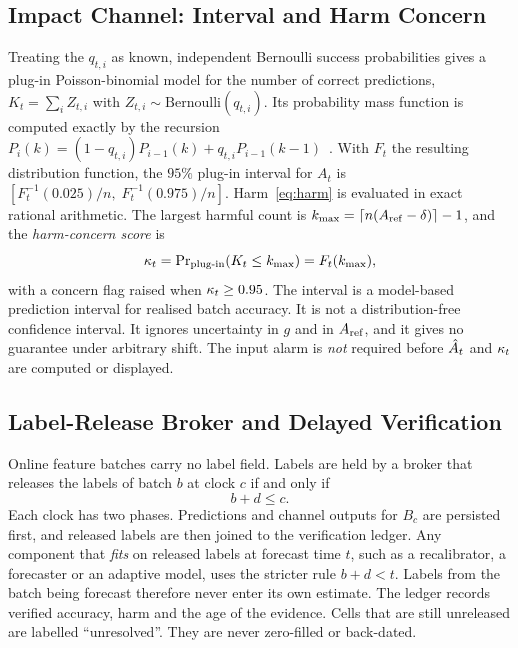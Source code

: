 \subsection{Impact Channel: Interval and Harm Concern}
Treating the $q_{t,i}$ as known, independent Bernoulli success probabilities gives
a plug-in Poisson-binomial model for the number of correct predictions,
$K_t=\sum_iZ_{t,i}$ with $Z_{t,i}\sim\mathrm{Bernoulli}(q_{t,i})$. Its probability
mass function is computed exactly by the recursion
$P_i(k)=(1-q_{t,i})P_{i-1}(k)+q_{t,i}P_{i-1}(k-1)$~\cite{hong2013poibin}.
With $F_t$ the resulting distribution function, the $95\%$ plug-in interval for
$A_t$ is $[F_t^{-1}(0.025)/n,\;F_t^{-1}(0.975)/n]$. Harm~\eqref{eq:harm} is
evaluated in exact rational arithmetic. The largest harmful count is
$k_{\max}=\lceil n(A_{\mathrm{ref}}-\delta)\rceil-1$, and the \emph{harm-concern score} is
\begin{equation}
\kappa_t=\Pr\nolimits_{\mathrm{plug\text{-}in}}(K_t\le k_{\max})=F_t(k_{\max}),
\label{eq:concern}
\end{equation}
with a concern flag raised when $\kappa_t\ge 0.95$. The interval is a model-based
prediction interval for realised batch accuracy. It is not a distribution-free
confidence interval. It ignores uncertainty in $g$ and in $A_{\mathrm{ref}}$, and it gives no
guarantee under arbitrary shift. The input alarm is \emph{not} required before
$\hat{A}_t$ and $\kappa_t$ are computed or displayed.

\subsection{Label-Release Broker and Delayed Verification}
\label{sec:broker}
Online feature batches carry no label field. Labels are held by a broker that
releases the labels of batch $b$ at clock $c$ if and only if
\begin{equation}
b+d\le c.
\label{eq:release}
\end{equation}
Each clock has two phases. Predictions and channel outputs for $B_c$ are persisted
first, and released labels are then joined to the verification ledger. Any
component that \emph{fits} on released labels at forecast time $t$, such as a
recalibrator, a forecaster or an adaptive model, uses the stricter rule $b+d<t$.
Labels from the batch being forecast therefore never enter its own estimate. The
ledger records verified accuracy, harm and the age of the evidence. Cells that are
still unreleased are labelled ``unresolved''. They are never zero-filled or
back-dated.

